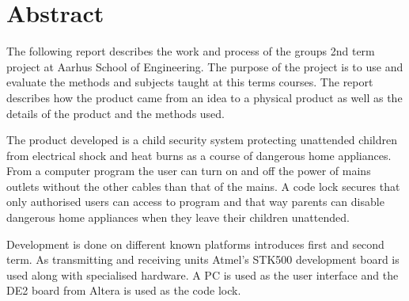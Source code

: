 \chapter{Abstract}
The following report describes the work and process of the groups 2nd term project at Aarhus School of Engineering. The purpose of the project is to use and evaluate the methods and subjects taught at this terms courses. The report describes how the product came from an idea to a physical product as well as the details of the product and the methods used.

The product developed is a child security system protecting unattended children from electrical shock and heat burns as a course of dangerous home appliances. From a computer program the user can turn on and off the power of mains outlets without the other cables than that of the mains. A code lock secures that only authorised users can access to program and that way parents can disable dangerous home appliances when they leave their children unattended.

Development is done on different known platforms introduces first and second term. As transmitting and receiving units Atmel’s STK500 development board is used along with specialised hardware. A PC is used as the user interface and the DE2 board from Altera is used as the code lock.


